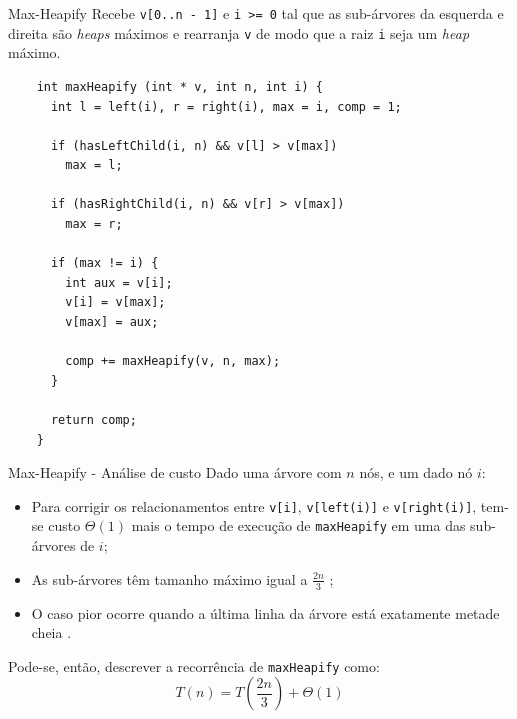 \documentclass[t, 10pt]{beamer}
\begin{document}
  \begin{frame}[fragile]{Max-Heapify}
    Recebe \texttt{v[0..n - 1]} e \texttt{i >= 0} tal que as sub-árvores da esquerda e direita
    são \emph{heaps} máximos e rearranja \texttt{v} de modo que a raiz \texttt{i} seja um
    \emph{heap} máximo.
    
    \vspace{-1em}
    \begin{center}
    \begin{minipage}{0.72\textwidth}
    \begin{verbatim}
    int maxHeapify (int * v, int n, int i) {
      int l = left(i), r = right(i), max = i, comp = 1;
      
      if (hasLeftChild(i, n) && v[l] > v[max])
        max = l;
      
      if (hasRightChild(i, n) && v[r] > v[max])
        max = r;
        
      if (max != i) {
        int aux = v[i];
        v[i] = v[max];
        v[max] = aux;
        
        comp += maxHeapify(v, n, max);
      }
      
      return comp;
    }
    \end{verbatim}
    \end{minipage}
    \end{center}
  \end{frame}

  \begin{frame}{Max-Heapify - Análise de custo}
    Dado uma árvore com $n$ nós, e um dado nó $i$:
    
    \begin{itemize}
      \item Para corrigir os relacionamentos entre \texttt{v[i]}, \texttt{v[left(i)]} e \texttt{v[right(i)]},
      tem-se custo $\Theta(1)$ mais o tempo de execução de \texttt{maxHeapify} em uma das sub-árvores de $i$;
      \item As sub-árvores têm tamanho máximo igual a $\frac{2n}{3}$ \footnotemark[1];
      \item O caso pior ocorre quando a última linha da árvore está exatamente metade cheia \footnotemark[2].
    \end{itemize}

    Pode-se, então, descrever a recorrência de \texttt{maxHeapify} como: $$T(n) = T\left(\frac{2n}{3}\right) + \Theta(1)$$
  
  \end{frame}
\end{document}
